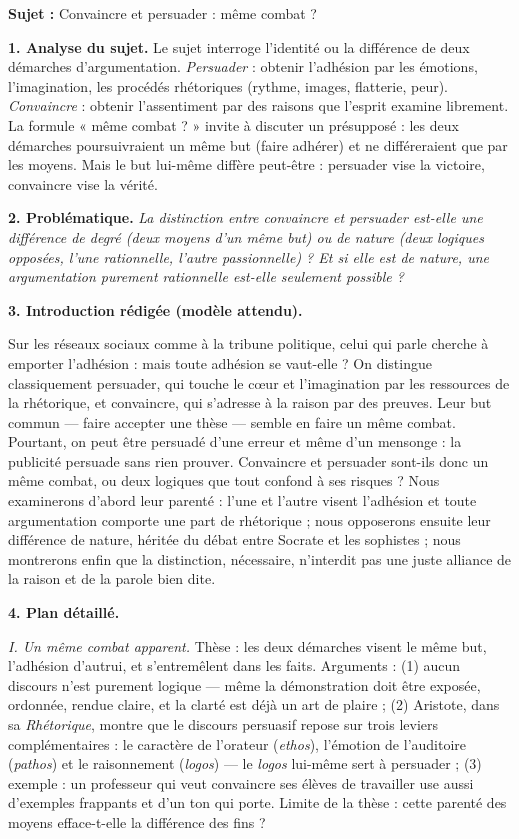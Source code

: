 \documentclass[11pt]{article}
\begin{document}
\begin{corrige}
\textbf{Sujet :} Convaincre et persuader : même combat ?

\tcblower

\textbf{1. Analyse du sujet.} Le sujet interroge l'identité ou la différence de deux démarches d'argumentation. \emph{Persuader} : obtenir l'adhésion par les émotions, l'imagination, les procédés rhétoriques (rythme, images, flatterie, peur). \emph{Convaincre} : obtenir l'assentiment par des raisons que l'esprit examine librement. La formule « même combat ? » invite à discuter un présupposé : les deux démarches poursuivraient un même but (faire adhérer) et ne différeraient que par les moyens. Mais le but lui-même diffère peut-être : persuader vise la victoire, convaincre vise la vérité.

\textbf{2. Problématique.} \emph{La distinction entre convaincre et persuader est-elle une différence de degré (deux moyens d'un même but) ou de nature (deux logiques opposées, l'une rationnelle, l'autre passionnelle) ? Et si elle est de nature, une argumentation purement rationnelle est-elle seulement possible ?}

\textbf{3. Introduction rédigée (modèle attendu).}

Sur les réseaux sociaux comme à la tribune politique, celui qui parle cherche à emporter l'adhésion : mais toute adhésion se vaut-elle ? On distingue classiquement persuader, qui touche le cœur et l'imagination par les ressources de la rhétorique, et convaincre, qui s'adresse à la raison par des preuves. Leur but commun --- faire accepter une thèse --- semble en faire un même combat. Pourtant, on peut être persuadé d'une erreur et même d'un mensonge : la publicité persuade sans rien prouver. Convaincre et persuader sont-ils donc un même combat, ou deux logiques que tout confond à ses risques ? Nous examinerons d'abord leur parenté : l'une et l'autre visent l'adhésion et toute argumentation comporte une part de rhétorique ; nous opposerons ensuite leur différence de nature, héritée du débat entre Socrate et les sophistes ; nous montrerons enfin que la distinction, nécessaire, n'interdit pas une juste alliance de la raison et de la parole bien dite.

\textbf{4. Plan détaillé.}

\emph{I. Un même combat apparent.} Thèse : les deux démarches visent le même but, l'adhésion d'autrui, et s'entremêlent dans les faits. Arguments : (1) aucun discours n'est purement logique --- même la démonstration doit être exposée, ordonnée, rendue claire, et la clarté est déjà un art de plaire ; (2) Aristote, dans sa \emph{Rhétorique}, montre que le discours persuasif repose sur trois leviers complémentaires : le caractère de l'orateur (\emph{ethos}), l'émotion de l'auditoire (\emph{pathos}) et le raisonnement (\emph{logos}) --- le \emph{logos} lui-même sert à persuader ; (3) exemple : un professeur qui veut convaincre ses élèves de travailler use aussi d'exemples frappants et d'un ton qui porte. Limite de la thèse : cette parenté des moyens efface-t-elle la différence des fins ?


\end{corrige}
\end{document}
